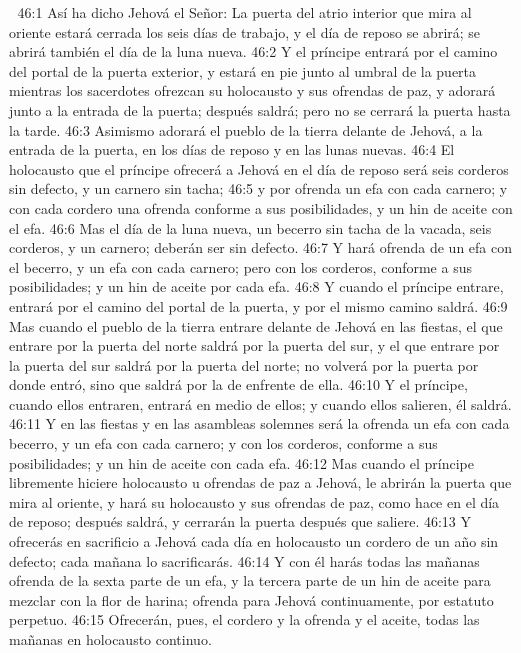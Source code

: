 
46:1 Así ha dicho Jehová el Señor: La puerta del atrio interior que mira al oriente estará cerrada los seis días de trabajo, y el día de reposo se abrirá; se abrirá también el día de la luna nueva.  
46:2 Y el príncipe entrará por el camino del portal de la puerta exterior, y estará en pie junto al umbral de la puerta mientras los sacerdotes ofrezcan su holocausto y sus ofrendas de paz, y adorará junto a la entrada de la puerta; después saldrá; pero no se cerrará la puerta hasta la tarde.  
46:3 Asimismo adorará el pueblo de la tierra delante de Jehová, a la entrada de la puerta, en los días de reposo y en las lunas nuevas.  
46:4 El holocausto que el príncipe ofrecerá a Jehová en el día de reposo será seis corderos sin defecto, y un carnero sin tacha;  
46:5 y por ofrenda un efa   con cada carnero; y con cada cordero una ofrenda conforme a sus posibilidades, y un hin de aceite con el efa.  
46:6 Mas el día de la luna nueva, un becerro sin tacha de la vacada, seis corderos, y un carnero; deberán ser sin defecto.  
46:7 Y hará ofrenda de un efa   con el becerro, y un efa con cada carnero; pero con los corderos, conforme a sus posibilidades; y un hin de aceite por cada efa.  
46:8 Y cuando el príncipe entrare, entrará por el camino del portal de la puerta, y por el mismo camino saldrá.  
46:9 Mas cuando el pueblo de la tierra entrare delante de Jehová en las fiestas, el que entrare por la puerta del norte saldrá por la puerta del sur, y el que entrare por la puerta del sur saldrá por la puerta del norte; no volverá por la puerta por donde entró, sino que saldrá por la de enfrente de ella.  
46:10 Y el príncipe, cuando ellos entraren, entrará en medio de ellos; y cuando ellos salieren, él saldrá.  
46:11 Y en las fiestas y en las asambleas solemnes será la ofrenda un efa   con cada becerro, y un efa con cada carnero; y con los corderos, conforme a sus posibilidades; y un hin de aceite con cada efa.  
46:12 Mas cuando el príncipe libremente hiciere holocausto u ofrendas de paz a Jehová, le abrirán la puerta que mira al oriente, y hará su holocausto y sus ofrendas de paz, como hace en el día de reposo; después saldrá, y cerrarán la puerta después que saliere.  
46:13 Y ofrecerás en sacrificio a Jehová cada día en holocausto un cordero de un año sin defecto; cada mañana lo sacrificarás.  
46:14 Y con él harás todas las mañanas ofrenda de la sexta parte de un efa,  y la tercera parte de un hin de aceite para mezclar con la flor de harina; ofrenda para Jehová continuamente, por estatuto perpetuo.  
46:15 Ofrecerán, pues, el cordero y la ofrenda y el aceite, todas las mañanas en holocausto continuo.  
